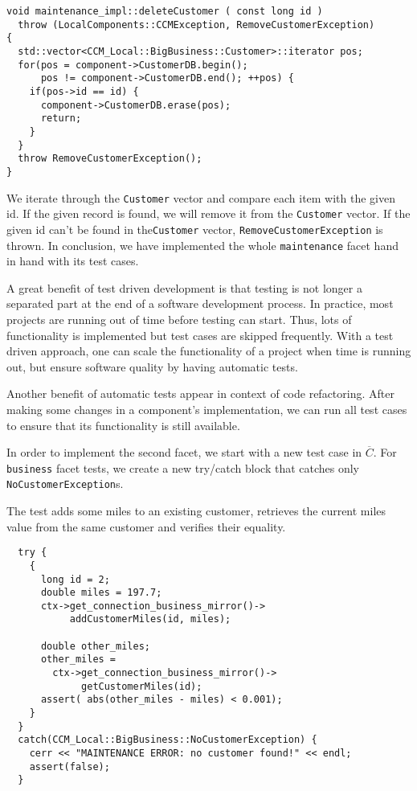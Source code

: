\begin{small}
\begin{verbatim}
void maintenance_impl::deleteCustomer ( const long id )
  throw (LocalComponents::CCMException, RemoveCustomerException)
{
  std::vector<CCM_Local::BigBusiness::Customer>::iterator pos;
  for(pos = component->CustomerDB.begin(); 
      pos != component->CustomerDB.end(); ++pos) {
    if(pos->id == id) {
      component->CustomerDB.erase(pos);
      return;
    }
  }
  throw RemoveCustomerException();  
}
\end{verbatim}
\end{small}

We iterate through the {\tt Customer} vector and compare 
each item with the given id.
If the given record is found, we will remove it from the {\tt Customer} vector.
If the given id can't be found in the{\tt Customer} vector, 
{\tt RemoveCustomerException} is thrown.
In conclusion, we have implemented the whole {\tt maintenance} facet hand in 
hand with its test cases. 

\vspace{3mm}
A great benefit of test driven development is that testing is not longer a 
separated part at the end of a software development process.
In practice, most projects are running out of time before testing can start. 
Thus, lots of functionality is implemented but test cases are skipped 
frequently.
With a test driven approach, one can scale the functionality of a project when 
time is running out, but ensure software quality by having automatic tests.

Another benefit of automatic tests appear in context of code refactoring. 
After making some changes in a component's implementation, we can run all test 
cases to ensure that its functionality is still available.


In order to implement the second facet, we start with a new test case in 
$\overline{C}$.
For {\tt business} facet tests, we create a new try/catch block that catches
only {\tt NoCustomerException}s.
 
The test adds some miles to an existing customer, retrieves the current miles 
value from the same customer and verifies their equality. 

\begin{small}
\begin{verbatim}
  try {
    {
      long id = 2;
      double miles = 197.7;
      ctx->get_connection_business_mirror()->
           addCustomerMiles(id, miles); 

      double other_miles;
      other_miles = 
        ctx->get_connection_business_mirror()->
             getCustomerMiles(id); 
      assert( abs(other_miles - miles) < 0.001);
    }
  }
  catch(CCM_Local::BigBusiness::NoCustomerException) {
    cerr << "MAINTENANCE ERROR: no customer found!" << endl;
    assert(false);
  }
\end{verbatim}
\end{small}


